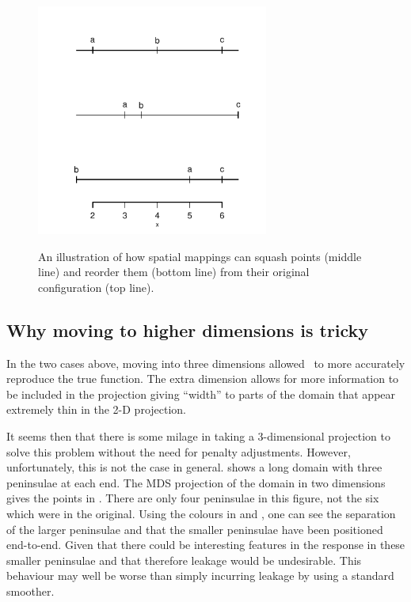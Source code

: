 \begin{figure}
\centering
\includegraphics[width=3in]{mds/figs/linedia.pdf} \\
\caption{An illustration of how spatial mappings can squash points (middle line) and reorder them (bottom line) from their original configuration (top line).}
\label{linedia}
\end{figure}

\subsection{Why moving to higher dimensions is tricky}
\label{nohigherdim}

In the two cases above, moving into three dimensions allowed \mdsap\ to more accurately reproduce the true function. The extra dimension allows for more information to be included in the projection giving ``width'' to parts of the domain that appear extremely thin in the 2-D projection.

It seems then that there is some milage in taking a 3-dimensional projection to solve this problem without the need for penalty adjustments. However, unfortunately, this is not the case in general.  shows a long domain with three peninsulae at each end. The MDS projection of the domain in two dimensions gives the points in . There are only four peninsulae in this figure, not the six which were in the original. Using the colours in  and , one can see the separation of the larger peninsulae and that the smaller peninsulae have been positioned end-to-end. Given that there could be interesting features in the response in these smaller peninsulae and that therefore leakage would be undesirable. This behaviour may well be worse than simply incurring leakage by using a standard smoother.

